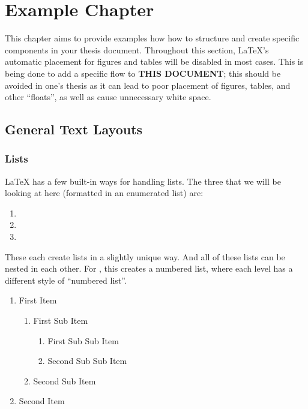 \chapter{Example Chapter}\label{ch:ExampleChapter}
  This chapter aims to provide examples how how to structure and create specific components in your thesis document.
  Throughout this section, \LaTeX's automatic placement for figures and tables will be disabled in most cases.
  This is being done to add a specific flow to \textbf{THIS DOCUMENT}; this should be avoided in one's thesis as it can lead to poor placement of figures, tables, and other \enquote{floats}, as well as cause unnecessary white space.
  \section{General Text Layouts}
    \subsection{Lists}
        \LaTeX{} has a few built-in ways for handling lists.
        The three that we will be looking at here (formatted in an enumerated list) are:
        \begin{enumerate}
            \item {}
            \item {}
            \item {}
        \end{enumerate}
        These each create lists in a slightly unique way.
        And all of these lists can be nested in each other.
        For , this creates a numbered list, where each level has a different style of \enquote{numbered list}.
        \begin{enumerate}
            \item First Item
                \begin{enumerate}
                    \item First Sub Item
                        \begin{enumerate}
                            \item First Sub Sub Item
                            \item Second Sub Sub Item
                        \end{enumerate}
                    \item Second Sub Item
                \end{enumerate}
            \item Second Item
        \end{enumerate}
